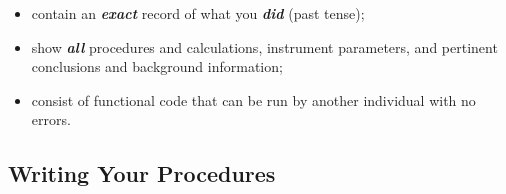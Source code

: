 \documentclass[]{tufte-book}
\providecommand{\tightlist}{%
  \setlength{\itemsep}{0pt}\setlength{\parskip}{0pt}}
\begin{document}
\begin{itemize}
\tightlist
\item
  contain an \textbf{\emph{exact}} record of what you \textbf{\emph{did}} (past tense);
\item
  show \textbf{\emph{all}} procedures and calculations, instrument parameters, and pertinent conclusions and background information;
\item
  consist of functional code that can be run by another individual with no errors.
\end{itemize}

\hypertarget{writing-your-procedures}{%
\subsection*{Writing Your Procedures}\label{writing-your-procedures}}
\end{document}
